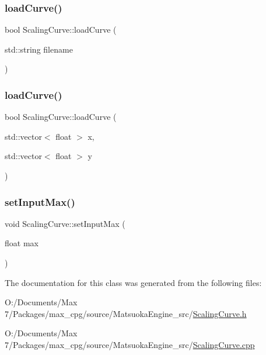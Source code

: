 \subsubsection{\texorpdfstring{load\+Curve()}{loadCurve()}\hspace{0.1cm}{\footnotesize\ttfamily [1/2]}}
{\footnotesize\ttfamily bool Scaling\+Curve\+::load\+Curve (\begin{DoxyParamCaption}\item[{std\+::string}]{filename }\end{DoxyParamCaption})}

\mbox{\label{classScalingCurve_a834725ff8c4c7763df12fb1c8a3010e1}} 
\subsubsection{\texorpdfstring{load\+Curve()}{loadCurve()}\hspace{0.1cm}{\footnotesize\ttfamily [2/2]}}
{\footnotesize\ttfamily bool Scaling\+Curve\+::load\+Curve (\begin{DoxyParamCaption}\item[{std\+::vector$<$ float $>$}]{x,  }\item[{std\+::vector$<$ float $>$}]{y }\end{DoxyParamCaption})}

\mbox{\label{classScalingCurve_a95c549a2017ba588478026e95c7198bd}} 
\subsubsection{\texorpdfstring{set\+Input\+Max()}{setInputMax()}}
{\footnotesize\ttfamily void Scaling\+Curve\+::set\+Input\+Max (\begin{DoxyParamCaption}\item[{float}]{max }\end{DoxyParamCaption})}



The documentation for this class was generated from the following files\+:\begin{DoxyCompactItemize}
\item 
O\+:/\+Documents/\+Max 7/\+Packages/max\+\_\+cpg/source/\+Matsuoka\+Engine\+\_\+src/\mbox{\hyperlink{ScalingCurve_8h}{Scaling\+Curve.\+h}}\item 
O\+:/\+Documents/\+Max 7/\+Packages/max\+\_\+cpg/source/\+Matsuoka\+Engine\+\_\+src/\mbox{\hyperlink{ScalingCurve_8cpp}{Scaling\+Curve.\+cpp}}\end{DoxyCompactItemize}
